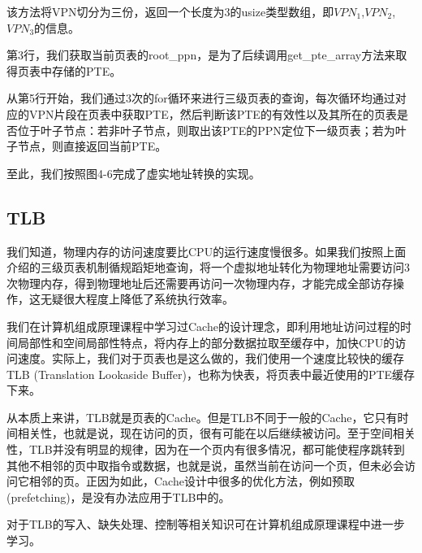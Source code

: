 该方法将VPN切分为三份，返回一个长度为3的usize类型数组，即$VPN_{1}$,$VPN_{2}$,$VPN_{3}$的信息。

第3行，我们获取当前页表的root\_ppn，是为了后续调用get\_pte\_array方法来取得页表中存储的PTE。

从第5行开始，我们通过3次的for循环来进行三级页表的查询，每次循环均通过对应的VPN片段在页表中获取PTE，然后判断该PTE的有效性以及其所在的页表是否位于叶子节点：若非叶子节点，则取出该PTE的PPN定位下一级页表；若为叶子节点，则直接返回当前PTE。

至此，我们按照图4-6完成了虚实地址转换的实现。

\subsection{TLB}

我们知道，物理内存的访问速度要比CPU的运行速度慢很多。如果我们按照上面介绍的三级页表机制循规蹈矩地查询，将一个虚拟地址转化为物理地址需要访问3次物理内存，得到物理地址后还需要再访问一次物理内存，才能完成全部访存操作，这无疑很大程度上降低了系统执行效率。

我们在计算机组成原理课程中学习过Cache的设计理念，即利用地址访问过程的时间局部性和空间局部性特点，将内存上的部分数据拉取至缓存中，加快CPU的访问速度。实际上，我们对于页表也是这么做的，我们使用一个速度比较快的缓存TLB (Translation Lookaside Buffer)，也称为快表，将页表中最近使用的PTE缓存下来。

从本质上来讲，TLB就是页表的Cache。但是TLB不同于一般的Cache，它只有时间相关性，也就是说，现在访问的页，很有可能在以后继续被访问。至于空间相关性，TLB并没有明显的规律，因为在一个页内有很多情况，都可能使程序跳转到其他不相邻的页中取指令或数据，也就是说，虽然当前在访问一个页，但未必会访问它相邻的页。正因为如此，Cache设计中很多的优化方法，例如预取 (prefetching)，是没有办法应用于TLB中的。

对于TLB的写入、缺失处理、控制等相关知识可在计算机组成原理课程中进一步学习。
